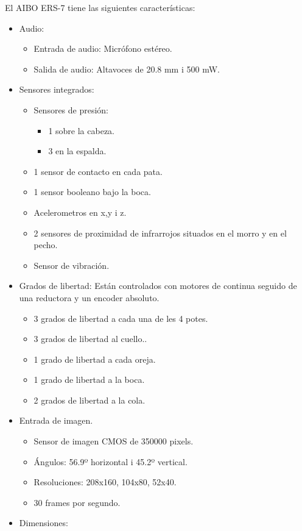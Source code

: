 \documentclass[12pt,a4paper,final,twoside]{book}
\begin{document}
El AIBO ERS-7 tiene las siguientes características: 
\begin{multicols}{2}
\begin{itemize}
\item Audio:
\begin{itemize}
\item Entrada de audio: Micrófono estéreo.
\item Salida de audio: Altavoces de 20.8 mm i 500 mW.
\end{itemize}
\item Sensores integrados:
\begin{itemize}
\item Sensores de presión:
\begin{itemize}
\item 1 sobre la cabeza.
\item 3 en la espalda.
\end{itemize}
\item 1 sensor de contacto en cada pata. 
\item 1 sensor booleano bajo la boca.
\item Acelerometros en x,y i z.
\item 2 sensores de proximidad de infrarrojos situados en el morro y en el pecho.
\item Sensor de vibración.
\end{itemize}
\item Grados de libertad: Están controlados con motores de continua seguido de una reductora y un encoder absoluto.
\begin{itemize}
\item 3 grados de libertad a cada una de les 4 potes.
\item 3 grados de libertad al cuello..
\item 1 grado de libertad a cada oreja.
\item 1 grado de libertad a la boca.
\item 2 grados de libertad a la cola. 
\end{itemize}
\item Entrada de imagen.
\begin{itemize}
\item Sensor de imagen CMOS de 350000 pixels.
\item Ángulos: 56.9º horizontal i 45.2º vertical.
\item Resoluciones: 208x160, 104x80, 52x40.
\item 30 frames por segundo.
\end{itemize}
\item Dimensiones:

\end{itemize}
\end{multicols}
\end{document}
